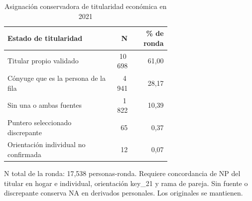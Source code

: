 \begin{table}[!htbp]
\centering
\caption{Asignación conservadora de titularidad económica en 2021}\label{tab:integracion-titularidad}
\small\setlength{\tabcolsep}{4pt}
\renewcommand{\arraystretch}{1.15}
\begin{tabular}{p{0.65\linewidth}rr}
\toprule
\textbf{Estado de titularidad} & \textbf{N} & \textbf{\% de ronda} \\
\midrule
Titular propio validado & 10\,698 & 61,00 \\
Cónyuge que es la persona de la fila & 4\,941 & 28,17 \\
Sin una o ambas fuentes & 1\,822 & 10,39 \\
Puntero seleccionado discrepante & 65 & 0,37 \\
Orientación individual no confirmada & 12 & 0,07 \\
\bottomrule
\end{tabular}
\par\medskip
\parbox{\linewidth}{\footnotesize N total de la ronda: 17,538 personas-ronda. Requiere concordancia de NP del titular en hogar e individual, orientación key\_21 y rama de pareja. Sin fuente o discrepante conserva NA en derivados personales. Los originales se mantienen.}
\end{table}
